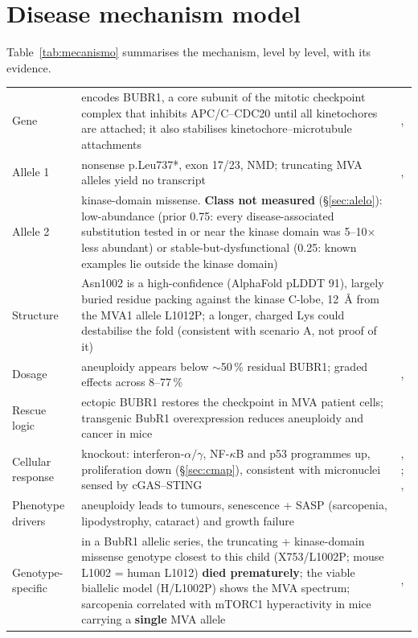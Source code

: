 \documentclass[10pt]{article}
\begin{document}
\section{Disease mechanism model}
Table~\ref{tab:mecanismo} summarises the mechanism, level by level, with its evidence.
\begin{table}[tbp]\tablefont
\begin{tabularx}{\linewidth}{@{}P{2.3cm}LP{3.4cm}@{}}
\toprule{} &  & \\\midrule
Gene &  encodes BUBR1, a core subunit of the mitotic checkpoint complex that inhibits APC/C–CDC20 until all kinetochores are attached; it also stabilises kinetochore–microtubule attachments & \citealp{baker13}, \\
Allele 1 & nonsense p.Leu737*, exon 17/23, NMD; truncating MVA alleles yield no transcript & \citealp{suij}, \\
Allele 2 & kinase-domain missense. \textbf{Class not measured} (§\ref{sec:alelo}): low-abundance (prior 0.75: every disease-associated substitution tested in or near the kinase domain was 5--10$\times$ less abundant) or stable-but-dysfunctional (0.25: known examples lie outside the kinase domain) & \citealp{suij}\\
Structure & Asn1002 is a high-confidence (AlphaFold pLDDT 91), largely buried residue packing against the kinase C-lobe, 12~Å from the MVA1 allele L1012P; a longer, charged Lys could destabilise the fold (consistent with scenario A, not proof of it) & \\
Dosage & aneuploidy appears below $\sim$50\,\% residual BUBR1; graded effects across 8–77\,\% & \citealp{bohers}, \\
Rescue logic & ectopic BUBR1 restores the checkpoint in MVA patient cells; transgenic BubR1 overexpression reduces aneuploidy and cancer in mice & \citealp{suij,baker13}\\
Cellular response & knockout: interferon-$\alpha/\gamma$, NF-$\kappa$B and p53 programmes up, proliferation down (§\ref{sec:cmap}), consistent with micronuclei sensed by cGAS–STING & \citealp{mackenzie}, ; \citealp{santaguida}, \\
Phenotype drivers & aneuploidy leads to tumours, senescence + SASP (sarcopenia, lipodystrophy, cataract) and growth failure & \citealp{baker04,baker11,sieben}\\
Genotype-specific & in a BubR1 allelic series, the truncating + kinase-domain missense genotype closest to this child (X753/L1002P; mouse L1002 = human L1012) \textbf{died prematurely}; the viable biallelic model (H/L1002P) shows the MVA spectrum; sarcopenia correlated with mTORC1 hyperactivity in mice carrying a \textbf{single} MVA allele & \citealp{sieben}, \\

\end{tabularx}
\end{table}
\end{document}
